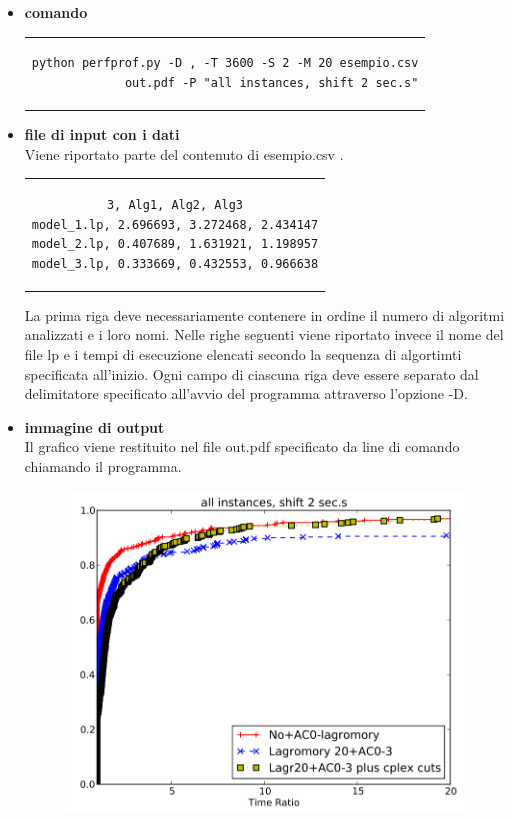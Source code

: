 \begin{itemize}
\item{\textbf{comando}
\begin{center}
\begin{tabular}{c}
\begin{lstlisting}[linewidth=330pt, basicstyle=\footnotesize\sffamily,] 
python perfprof.py -D , -T 3600 -S 2 -M 20 esempio.csv
             out.pdf -P "all instances, shift 2 sec.s"
\end{lstlisting}
\end{tabular}
\end{center}
}
\item{\textbf{file di input con i dati}\\
Viene riportato parte del contenuto di esempio.csv .
\begin{center}
\begin{tabular}{c}
\begin{lstlisting}[linewidth=240pt, basicstyle=\footnotesize\sffamily,] 
3, Alg1, Alg2, Alg3
model_1.lp, 2.696693, 3.272468, 2.434147
model_2.lp, 0.407689, 1.631921, 1.198957
model_3.lp, 0.333669, 0.432553, 0.966638
\end{lstlisting}
\end{tabular}
\end{center}
La prima riga deve necessariamente contenere in ordine il numero di algoritmi analizzati e i loro nomi. Nelle righe seguenti viene riportato invece il nome del file lp e i tempi di esecuzione elencati secondo la sequenza di algortimti specificata all'inizio.
Ogni campo di ciascuna riga deve essere separato dal delimitatore specificato all'avvio del programma attraverso l'opzione -D.
}
\item{\textbf{immagine di output}\\
Il grafico viene restituito nel file out.pdf specificato da line di comando chiamando il programma.
\begin{figure}[h] 
\begin{center} 
  \includegraphics[scale=0.6]{Images/profile_out}\\ 
\end{center} 
\end{figure}
}
\end{itemize}
